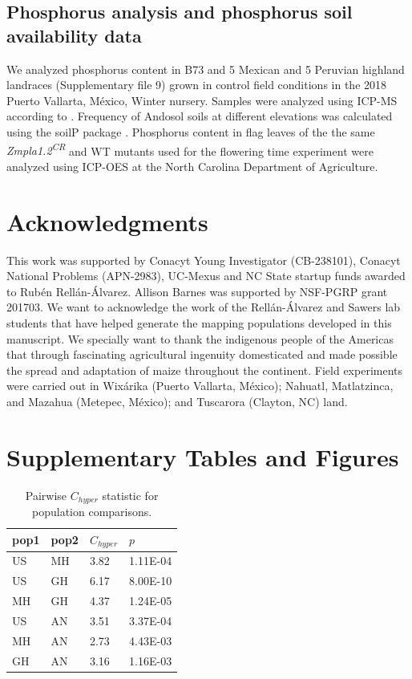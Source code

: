 \documentclass[9pt,twocolumn,twoside,lineno]{BioRxiv}
\begin{document}
\subsection{Phosphorus analysis and phosphorus soil availability data}
We analyzed phosphorus content in B73 and 5 Mexican  and 5 Peruvian highland landraces (Supplementary file 9) grown in control field conditions in the 2018 Puerto Vallarta, México, Winter nursery. 
Samples were analyzed using ICP-MS according to \cite{Baxter2014-ch}. 
Frequency of Andosol soils at different elevations was calculated using the soilP package \cite{Rodriguez-Zapata2018-vz}.
Phosphorus content in flag leaves of the the same \textit{Zmpla1.2\textsuperscript{CR}} and WT mutants used for the flowering time experiment were analyzed using ICP-OES at the North Carolina Department of Agriculture.   

\section{Acknowledgments}
This work was supported by Conacyt Young Investigator (CB-238101), Conacyt National Problems (APN-2983), UC-Mexus and NC State startup funds awarded to Rubén Rellán-Álvarez. Allison Barnes was supported by NSF-PGRP grant 201703.
We want to acknowledge the work of the Rellán-Álvarez and Sawers lab students that have helped generate the mapping populations developed in this manuscript.
We specially want to thank the indigenous people of the Americas that through fascinating agricultural ingenuity domesticated and made possible the spread and adaptation of maize throughout the continent. 
Field experiments were carried out in Wixárika (Puerto Vallarta, México); Nahuatl, Matlatzinca, and Mazahua (Metepec, México); and Tuscarora (Clayton, NC) land.
\label{sec:acknowledgments}



\clearpage

\onecolumn

\section*{Supplementary Tables and Figures}

\begin{table}[h!]

\centering
\begin{tabular}{@{}llll@{}}
\toprule
pop1 & pop2 & $C_{hyper}$   & $p$  \\ \midrule
US   & MH   & 3.82 & 1.11E-04 \\
US   & GH   & 6.17 & 8.00E-10 \\
MH   & GH   & 4.37 & 1.24E-05 \\
US   & AN   & 3.51 & 3.37E-04 \\
MH   & AN   & 2.73 & 4.43E-03 \\
GH   & AN   & 3.16 & 1.16E-03 \\ \bottomrule
\end{tabular}
\label{tab:table1}
\caption{Pairwise $C_{hyper}$ statistic for population comparisons.}
\end{table}
\end{document}
